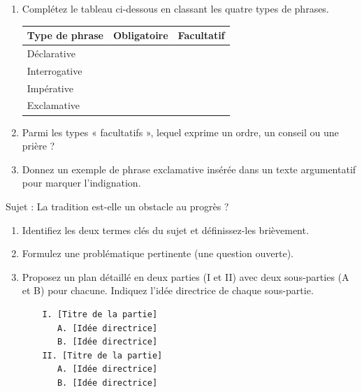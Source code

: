 \documentclass[11pt]{article}
\begin{document}
\begin{exercice}
\begin{enumerate}
    \item Complétez le tableau ci-dessous en classant les quatre types de phrases.
    \begin{center}
    \begin{tabular}{|l|c|c|}
    \hline
    \textbf{Type de phrase} & \textbf{Obligatoire} & \textbf{Facultatif} \\
    \hline
    Déclarative & & \\
    \hline
    Interrogative & & \\
    \hline
    Impérative & & \\
    \hline
    Exclamative & & \\
    \hline
    \end{tabular}
    \end{center}
    \item Parmi les types « facultatifs », lequel exprime un ordre, un conseil ou une prière ?
    \item Donnez un exemple de phrase exclamative insérée dans un texte argumentatif pour marquer l'indignation.
\end{enumerate}
\end{exercice}

\begin{exercice}
\noindent Sujet : \og La tradition est-elle un obstacle au progrès ? \fg
\begin{enumerate}
    \item Identifiez les deux termes clés du sujet et définissez-les brièvement.
    \item Formulez une problématique pertinente (une question ouverte).
    \item Proposez un plan détaillé en deux parties (I et II) avec deux sous-parties (A et B) pour chacune. Indiquez l'idée directrice de chaque sous-partie.
    \begin{verbatim}
    I. [Titre de la partie]
       A. [Idée directrice]
       B. [Idée directrice]
    II. [Titre de la partie]
       A. [Idée directrice]
       B. [Idée directrice]
    \end{verbatim}
\end{enumerate}
\end{exercice}
\end{document}
